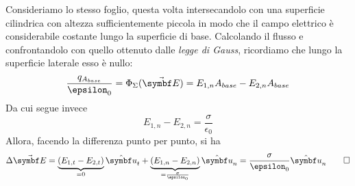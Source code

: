 \begin{demonstration}
\begin{center}
\end{center}
Consideriamo lo stesso foglio, questa volta intersecandolo con una superficie cilindrica con altezza sufficientemente piccola in modo che  il campo elettrico è considerabile costante lungo la superficie di base. Calcolando il flusso e confrontandolo con quello ottenuto dalle \textit{legge di Gauss}, ricordiamo che lungo la superficie laterale esso è nullo:
\begin{equation*}
	\frac{q_{A_{base}}}{\epsilon_0}=\Phi_{\Sigma}(\vba{E})=E_{1,n}A_{base}-E_{2,n}A_{base}
\end{equation*}
Da cui segue invece
\begin{equation*}
	E_{1,n}-E_{2,n}=\frac{\sigma}{\epsilon_0}
\end{equation*}
Allora, facendo la differenza punto per punto, si ha
\begin{equation*}
	\Delta\vba{E}=\underbrace{\left(E_{1,t}-E_{2,t}\right)}_{=0}\vbh{u}_t+\underbrace{\left(E_{1,n}-E_{2,n}\right)}_{=\frac{\sigma}{\epsilon_0}}\vbh{u}_n=\frac{\sigma}{\epsilon_0}\vbh{u}_n\qedhere
\end{equation*}
\end{demonstration}
